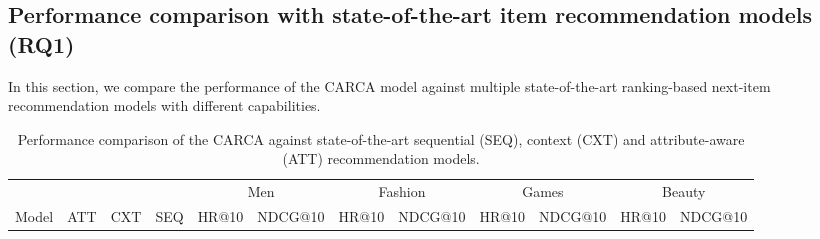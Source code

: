\documentclass[sigconf,natbib=true]{acmart}
\begin{document}
\subsection{Performance comparison with state-of-the-art item recommendation models (RQ1)}
In this section, we compare the performance of the CARCA model against multiple state-of-the-art ranking-based next-item recommendation models with different capabilities. 


\begin{table*}[!ht]
\setlength{\tabcolsep}{2.5pt}
\caption{Performance comparison of the CARCA against state-of-the-art sequential (SEQ), context (CXT) and attribute-aware (ATT) recommendation models.}
\label{Comp1}
\small
\begin{center}
\begin{tabular}{l|ccc|cccccccc}
    \toprule
 &&&& \multicolumn{2}{c}{Men} & \multicolumn{2}{c}{Fashion} & \multicolumn{2}{c}{Games} & \multicolumn{2}{c}{Beauty} \\
 
Model&ATT&CXT&SEQ & HR@10 & NDCG@10  & HR@10 & NDCG@10    & HR@10& NDCG@10   & HR@10 & NDCG@10   \\
\midrule


\end{tabular}
\end{center}
\end{table*}
\end{document}
